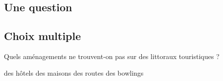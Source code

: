 \documentclass[a4paper,12pt]{exam}
\begin{document}
 \begin{questions}
     \section*{Une question}
     \subsection*{Choix multiple}
 \question Quels aménagements ne trouvent-on pas sur des littoraux touristiques ?
 \begin{oneparchoices}
 \choice des hôtels
 \choice des maisons
 \choice des routes
 \choice des bowlings
 \end{oneparchoices}
 \end{questions}
 
\end{document}

